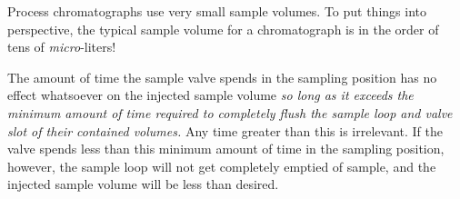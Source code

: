 \vskip 10pt

Process chromatographs use very small sample volumes.  To put things into perspective, the typical sample volume for a chromatograph is in the order of tens of {\it micro}-liters! 

\vskip 10pt

The amount of time the sample valve spends in the sampling position has no effect whatsoever on the injected sample volume {\it so long as it exceeds the minimum amount of time required to completely flush the sample loop and valve slot of their contained volumes.}  Any time greater than this is irrelevant.  If the valve spends less than this minimum amount of time in the sampling position, however, the sample loop will not get completely emptied of sample, and the injected sample volume will be less than desired.











